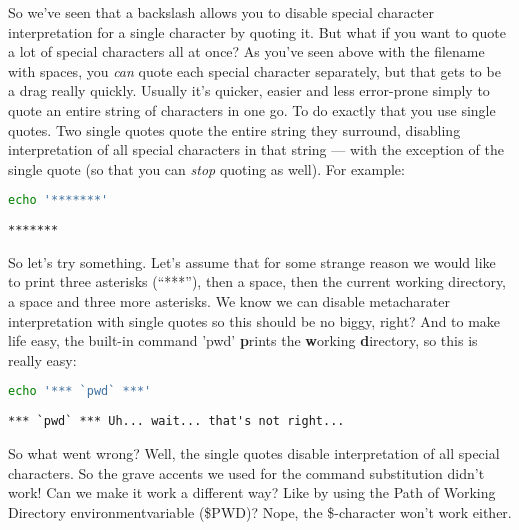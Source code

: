 So we've seen that a backslash allows you to disable special character
interpretation for a single character by quoting it. But what if you want to
quote a lot of special characters all at once? As you've seen above with the
filename with spaces, you \emph{can} quote each special character separately,
but that gets to be a drag really quickly. Usually it's quicker, easier and
less error-prone simply to quote an entire string of characters in one go. To
do exactly that you use single quotes. Two single quotes quote the entire
string they surround, disabling interpretation of all special characters in
that string --- with the exception of the single quote (so that you can
\emph{stop} quoting as well). For example:
\lstset{basicstyle=\scriptsize, numbers=left, captionpos=b, tabsize=4}
\begin{lstlisting}[caption=Quoting to use lots of asterisks,language={bash},
breaklines=true,xleftmargin=15pt,label=lst:Quoting to use lots of asterisks]
echo '*******'
\end{lstlisting}

\scriptsize
\begin{verbatim}
*******
\end{verbatim}
\normalsize

So let's try something. Let's assume that for some strange reason we would like
to print three asterisks (``***''), then a space, then the current working
directory, a space and three more asterisks. We know we can disable
metacharater interpretation with single quotes so this should be no biggy,
right? And to make life easy, the built-in command 'pwd' \textbf{p}rints the
\textbf{w}orking \textbf{d}irectory, so this is really easy:

\lstset{basicstyle=\scriptsize, numbers=left, captionpos=b, tabsize=4}
\begin{lstlisting}[caption=Printing the working directory with decorations,language={bash},
breaklines=true,xleftmargin=15pt,label=lst:Printing the working directory with decorations]
echo '*** `pwd` ***'
\end{lstlisting}

\scriptsize
\begin{verbatim}
*** `pwd` *** Uh... wait... that's not right...
\end{verbatim}
\normalsize

So what went wrong? Well, the single quotes disable interpretation of all
special characters. So the grave accents we used for the command substitution
didn't work! Can we make it work a different way? Like by using the Path of
Working Directory environmentvariable (\$PWD)? Nope, the \$-character won't
work either.

